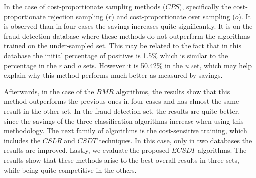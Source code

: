 {  In the case of cost-proportionate sampling methods ($CPS$), specifically the 
  cost-proportionate rejection sampling ($r$) and cost-proportionate over 
  sampling ($o$). It is observed than in four cases the savings increases quite 
  significantly. It is on the fraud detection database where these methods do not outperform the 
  algorithms trained on the under-sampled set. This may be related to the fact that in this 
  database the initial percentage of positives is 1.5\% which is similar to the percentage in the 
  $r$ and   $o$ sets. However it is 50.42\% in the $u$ set, which may help explain why this method 
  performs much better as measured by savings.

  Afterwards, in the case of the $BMR$ algorithms, the results show that this method outperforms 
  the previous ones in four cases and has almost the same result in the other set. In the fraud 
  detection  set, the results are quite better, since the savings of the three classification 
  algorithms increase when using this methodology. The next family of algorithms is the 
  cost-sensitive training, which includes the $CSLR$ and $CSDT$ techniques. In this case, only in 
  two databases the results are improved. Lastly, we evaluate the proposed $ECSDT$ algorithms. The 
  results show that these methods arise to the best overall results in three sets, while being 
  quite competitive in the others.
  
}
